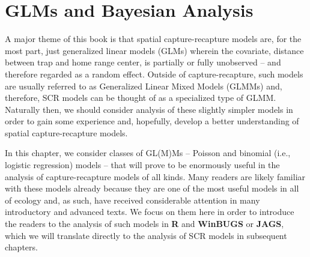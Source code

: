 \chapter{
 GLMs and Bayesian Analysis
}
\label{chapt.glms}

\vspace{.3in}




A major theme of this book is that spatial capture-recapture models
are, for the most part, just generalized linear models (GLMs) wherein
the covariate, distance between trap and home range center, is
partially or fully unobserved  -- and therefore regarded as
a random effect. Outside of capture-recapture, such models
are usually referred to as Generalized Linear Mixed Models (GLMMs)
and, therefore, SCR models can be thought of as a specialized type of
GLMM. Naturally then, we should consider analysis of these slightly
simpler models in order to gain some experience and, hopefully,
develop a better understanding of spatial capture-recapture models.

In this chapter, we consider classes of GL(M)Ms -- Poisson and
binomial (i.e., logistic regression) models -- that will prove to be
enormously useful in the analysis of capture-recapture models of all
kinds. Many readers are likely familiar with these models already because
they are one of
the most useful models in all of ecology and, as
such, have received considerable attention in many introductory and
advanced texts. We focus on them here in order to introduce the
readers to the analysis of such models in {\bf R} and {\bf WinBUGS} or
{\bf JAGS},
which we will
translate directly to the analysis of SCR models in subsequent
chapters.

